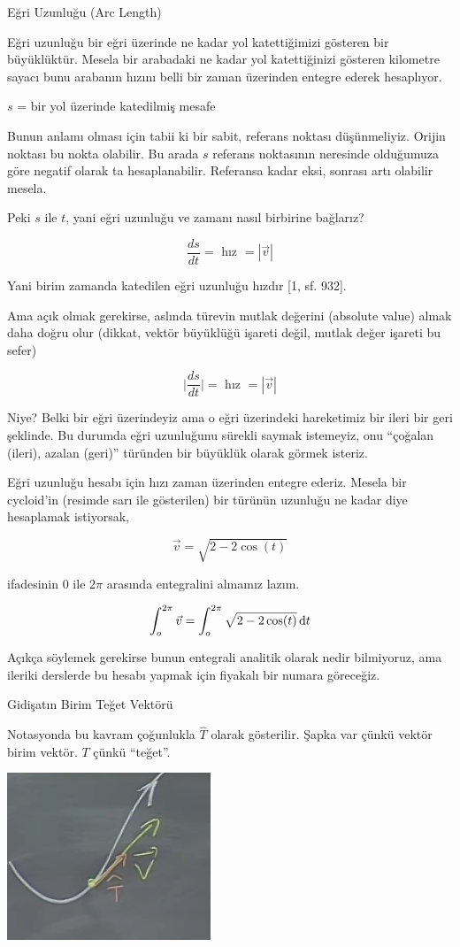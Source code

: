 \documentclass[12pt,fleqn]{article}\usepackage{../../common}
\begin{document}
Eğri Uzunluğu (Arc Length)

Eğri uzunluğu bir eğri üzerinde ne kadar yol katettiğimizi gösteren bir
büyüklüktür. Mesela bir arabadaki ne kadar yol katettiğinizi gösteren
kilometre sayacı bunu arabanın hızını belli bir zaman üzerinden entegre
ederek hesaplıyor.

$s$ = bir yol üzerinde katedilmiş mesafe

Bunun anlamı olması için tabii ki bir sabit, referans noktası
düşünmeliyiz. Orijin noktası bu nokta olabilir. Bu arada $s$ referans
noktasının neresinde olduğumuza göre negatif olarak ta
hesaplanabilir. Referansa kadar eksi, sonrası artı olabilir mesela.

Peki $s$ ile $t$, yani eğri uzunluğu ve zamanı nasıl birbirine bağlarız? 

$$ \frac{ds}{dt} = \textrm{ hız } = |\vec{v}| $$

Yani birim zamanda katedilen eğri uzunluğu hızdır [1, sf. 932].

Ama açık olmak gerekirse, aslında türevin mutlak değerini (absolute value) almak
daha doğru olur (dikkat, vektör büyüklüğü işareti değil, mutlak değer işareti bu
sefer)

$$ \bigg| \frac{ds}{dt} \bigg| = \textrm{ hız } = |\vec{v}| $$

Niye? Belki bir eğri üzerindeyiz ama o eğri üzerindeki hareketimiz bir ileri bir
geri şeklinde. Bu durumda eğri uzunluğunu sürekli saymak istemeyiz, onu
``çoğalan (ileri), azalan (geri)'' türünden bir büyüklük olarak görmek isteriz.

Eğri uzunluğu hesabı için hızı zaman üzerinden entegre ederiz. Mesela bir
cycloid'in (resimde sarı ile gösterilen) bir türünün uzunluğu ne kadar diye
hesaplamak istiyorsak, 

$$ \vec{v} = \sqrt{ 2-2\cos(t) } $$

ifadesinin 0 ile $2\pi$ arasında entegralini almamız lazım. 

$$ \int_o^{2\pi} \vec{v} = \int_o^{2\pi} \sqrt{ 2-2\cos(t) } \,\mathrm{d} t $$

Açıkça söylemek gerekirse bunun entegrali analitik olarak nedir bilmiyoruz,
ama ileriki derslerde bu hesabı yapmak için fiyakalı bir numara göreceğiz. 

Gidişatın Birim Teğet Vektörü

Notasyonda bu kavram çoğunlukla $\hat{T}$ olarak gösterilir. Şapka var
çünkü vektör birim vektör. $T$ çünkü ``teğet''. 

\includegraphics[height=5cm]{6_3.png}
\end{document}
